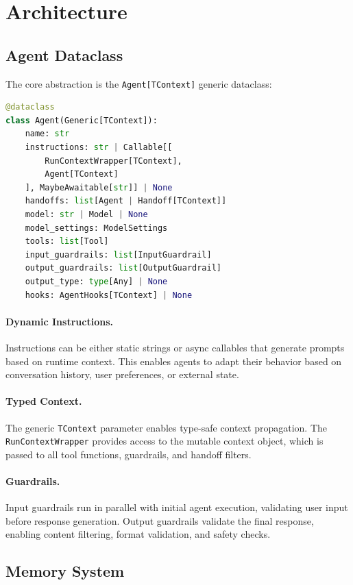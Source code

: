 \section{Architecture}


\subsection{Agent Dataclass}

The core abstraction is the \texttt{Agent[TContext]} generic dataclass:

\begin{lstlisting}[language=Python]
@dataclass
class Agent(Generic[TContext]):
    name: str
    instructions: str | Callable[[
        RunContextWrapper[TContext],
        Agent[TContext]
    ], MaybeAwaitable[str]] | None
    handoffs: list[Agent | Handoff[TContext]]
    model: str | Model | None
    model_settings: ModelSettings
    tools: list[Tool]
    input_guardrails: list[InputGuardrail]
    output_guardrails: list[OutputGuardrail]
    output_type: type[Any] | None
    hooks: AgentHooks[TContext] | None
\end{lstlisting}

\paragraph{Dynamic Instructions.} Instructions can be either static strings or async callables that generate prompts based on runtime context. This enables agents to adapt their behavior based on conversation history, user preferences, or external state.

\paragraph{Typed Context.} The generic \texttt{TContext} parameter enables type-safe context propagation. The \texttt{RunContextWrapper} provides access to the mutable context object, which is passed to all tool functions, guardrails, and handoff filters.

\paragraph{Guardrails.} Input guardrails run in parallel with initial agent execution, validating user input before response generation. Output guardrails validate the final response, enabling content filtering, format validation, and safety checks.

\subsection{Memory System}


